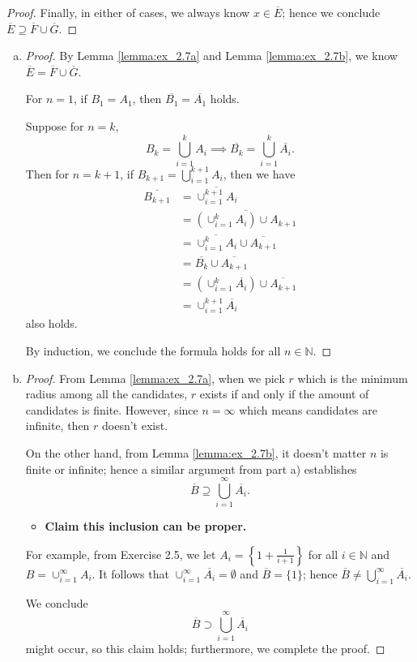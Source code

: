 \begin{Exercise}
\begin{proof}
		Finally, in either of cases, we always know $x\in \overline{E}$; hence we conclude $\overline{E} \supseteq \overline{F}\cup\overline{G}$.
	\end{proof}
	\begin{enumerate}[a)]
		\item
		\begin{proof}
			By Lemma \ref{lemma:ex_2.7a} and Lemma \ref{lemma:ex_2.7b}, we know $\overline{E} = \overline{F}\cup\overline{G}$.
			
			For $n=1$, if $B_1 = A_1$, then $\overline{B_1} = \overline{A_1}$ holds.
			
			Suppose for $n=k$, 
			$$
			B_k = \bigcup_{i=1}^{k}A_i \implies \overline{B_k} = \bigcup_{i=1}^{k}\overline{A_i}.
			$$
			Then for $n=k+1$, if $B_{k+1} = \bigcup_{i=1}^{k+1}A_i$, then we have
			\begin{align*}
			\overline{B_{k+1}}
			&= \overline{\cup_{i=1}^{k+1}A_i} \\
			&= \overline{\left( \cup_{i=1}^{k}A_i \right) \cup A_{k+1}} \\
			&= \overline{\cup_{i=1}^{k}A_i} \cup \overline{A_{k+1}} \\
			&= \overline{B_k} \cup \overline{A_{k+1}} \\
			&= \left( \cup_{i=1}^{k}\overline{A_i} \right) \cup \overline{A_{k+1}} \\
			&= \cup_{i=1}^{k+1}\overline{A_i}
			\end{align*}
			also holds. 
			
			By induction, we conclude the formula holds for all $n\in\mathbb{N}$.
		\end{proof}
		
		\item
		\begin{proof}
			From Lemma \ref{lemma:ex_2.7a}, when we pick $r$ which is the minimum radius among all the candidates, $r$ exists if and only if the amount of candidates is finite. However, since $n=\infty$ which means candidates are infinite, then $r$ doesn't exist.
			
			On the other hand, from Lemma \ref{lemma:ex_2.7b}, it doesn't matter $n$ is finite or infinite; hence a similar argument from part a) establishes
			$$
			\overline{B} \supseteq \bigcup_{i=1}^{\infty}\overline{A_i}.
			$$
			
			\begin{itemize}
				\item \textbf{Claim this inclusion can be proper.}
			\end{itemize}
			
			For example, from Exercise 2.5, we let $A_i = \left\{ 1+\frac{1}{i+1} \right\}$ for all $i\in\mathbb{N}$ and $B=\cup_{i=1}^{\infty} A_i$. It follows that $\cup_{i=1}^{\infty}\overline{A_i} = \emptyset$ and $\overline{B} = \{1\}$; hence $\overline{B} \neq \bigcup_{i=1}^{\infty}\overline{A_i}$.
			
			We conclude
			$$
			\overline{B} \supset \bigcup_{i=1}^{\infty}\overline{A_i}
			$$
			might occur, so this claim holds; furthermore, we complete the proof.
		\end{proof}
	\end{enumerate}
\end{Exercise}